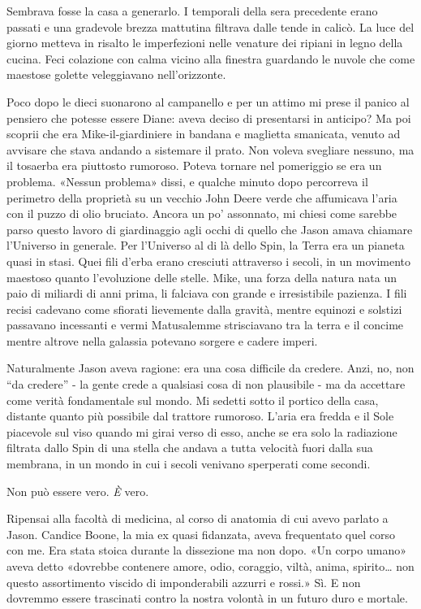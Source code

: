 Sembrava fosse la casa a generarlo. I temporali della sera precedente
erano passati e una gradevole brezza mattutina filtrava dalle tende in
calicò. La luce del giorno metteva in risalto le imperfezioni nelle
venature dei ripiani in legno della cucina. Feci colazione con calma
vicino alla finestra guardando le nuvole che come maestose golette
veleggiavano nell'orizzonte.

Poco dopo le dieci suonarono al campanello e per un attimo mi prese il
panico al pensiero che potesse essere Diane: aveva deciso di presentarsi
in anticipo? Ma poi scoprii che era Mike-il-giardiniere in bandana e
maglietta smanicata, venuto ad avvisare che stava andando a sistemare il
prato. Non voleva svegliare nessuno, ma il tosaerba era piuttosto
rumoroso. Poteva tornare nel pomeriggio se era un problema. «Nessun
problema» dissi, e qualche minuto dopo percorreva il perimetro della
proprietà su un vecchio John Deere verde che affumicava l'aria con il
puzzo di olio bruciato. Ancora un po' assonnato, mi chiesi come sarebbe
parso questo lavoro di giardinaggio agli occhi di quello che Jason amava
chiamare l'Universo in generale. Per l'Universo al di là dello Spin, la
Terra era un pianeta quasi in stasi. Quei fili d'erba erano cresciuti
attraverso i secoli, in un movimento maestoso quanto l'evoluzione delle
stelle. Mike, una forza della natura nata un paio di miliardi di anni
prima, li falciava con grande e irresistibile pazienza. I fili recisi
cadevano come sfiorati lievemente dalla gravità, mentre equinozi e
solstizi passavano incessanti e vermi Matusalemme strisciavano tra la
terra e il concime mentre altrove nella galassia potevano sorgere e
cadere imperi.

Naturalmente Jason aveva ragione: era una cosa difficile da credere.
Anzi, no, non ``da credere'' - la gente crede a qualsiasi cosa di non
plausibile - ma da accettare come verità fondamentale sul mondo. Mi
sedetti sotto il portico della casa, distante quanto più possibile dal
trattore rumoroso. L'aria era fredda e il Sole piacevole sul viso quando
mi girai verso di esso, anche se era solo la radiazione filtrata dallo
Spin di una stella che andava a tutta velocità fuori dalla sua membrana,
in un mondo in cui i secoli venivano sperperati come secondi.

Non può essere vero. \emph{È} vero.

Ripensai alla facoltà di medicina, al corso di anatomia di cui avevo
parlato a Jason. Candice Boone, la mia ex quasi fidanzata, aveva
frequentato quel corso con me. Era stata stoica durante la dissezione ma
non dopo. «Un corpo umano» aveva detto «dovrebbe contenere amore, odio,
coraggio, viltà, anima, spirito\ldots{} non questo assortimento viscido
di imponderabili azzurri e rossi.» Sì. E non dovremmo essere trascinati
contro la nostra volontà in un futuro duro e mortale.

